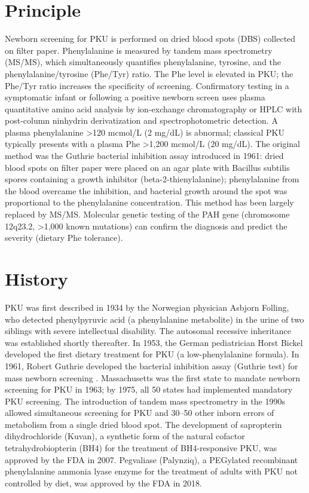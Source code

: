 \section*{Principle}
Newborn screening for PKU is performed on dried blood spots (DBS) collected on filter paper. Phenylalanine is measured by tandem mass spectrometry (MS/MS), which simultaneously quantifies phenylalanine, tyrosine, and the phenylalanine/tyrosine (Phe/Tyr) ratio. The Phe level is elevated in PKU; the Phe/Tyr ratio increases the specificity of screening. Confirmatory testing in a symptomatic infant or following a positive newborn screen uses plasma quantitative amino acid analysis by ion-exchange chromatography or HPLC with post-column ninhydrin derivatization and spectrophotometric detection. A plasma phenylalanine >120 mcmol/L (2 mg/dL) is abnormal; classical PKU typically presents with a plasma Phe >1,200 mcmol/L (20 mg/dL). The original method was the Guthrie bacterial inhibition assay introduced in 1961: dried blood spots on filter paper were placed on an agar plate with Bacillus subtilis spores containing a growth inhibitor (beta-2-thienylalanine); phenylalanine from the blood overcame the inhibition, and bacterial growth around the spot was proportional to the phenylalanine concentration. This method has been largely replaced by MS/MS. Molecular genetic testing of the PAH gene (chromosome 12q23.2, >1,000 known mutations) can confirm the diagnosis and predict the severity (dietary Phe tolerance).

\section*{History}
PKU was first described in 1934 by the Norwegian physician Asbjorn Folling, who detected phenylpyruvic acid (a phenylalanine metabolite) in the urine of two siblings with severe intellectual disability. The autosomal recessive inheritance was established shortly thereafter. In 1953, the German pediatrician Horst Bickel developed the first dietary treatment for PKU (a low-phenylalanine formula). In 1961, Robert Guthrie developed the bacterial inhibition assay (Guthrie test) for mass newborn screening \cite{guthrie1963simple}. Massachusetts was the first state to mandate newborn screening for PKU in 1963; by 1975, all 50 states had implemented mandatory PKU screening. The introduction of tandem mass spectrometry in the 1990s allowed simultaneous screening for PKU and 30--50 other inborn errors of metabolism from a single dried blood spot. The development of sapropterin dihydrochloride (Kuvan), a synthetic form of the natural cofactor tetrahydrobiopterin (BH4) for the treatment of BH4-responsive PKU, was approved by the FDA in 2007. Pegvaliase (Palynziq), a PEGylated recombinant phenylalanine ammonia lyase enzyme for the treatment of adults with PKU not controlled by diet, was approved by the FDA in 2018.

